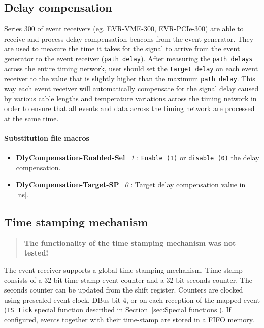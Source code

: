 \documentclass[12pt,a4paper]{article}
\begin{document}
\subsection{Delay compensation}\label{sec:Delay compensation}
Series 300 of event receivers (eg. EVR-VME-300, EVR-PCIe-300) are able to receive and process delay compensation beacons from the event generator. They are used to measure the time it takes for the signal to arrive from the event generator to the event receiver (\texttt{path delay}). After measuring the \texttt{path delays} across the entire timing network, user should set the \texttt{target delay} on each event receiver to the value that is slightly higher than the maximum \texttt{path delay}. This way each event receiver will automatically compensate for the signal delay caused by various cable lengths and temperature variations across the timing network in order to ensure that all events and data across the timing network are processed at the same time.

\paragraph{Substitution file macros}
\begin{itemize}
\item
  \textbf{DlyCompensation-Enabled-Sel}=\emph{1} : \texttt{Enable (1)} or \texttt{disable (0)} the delay compensation.
\item 
  \textbf{DlyCompensation-Target-SP}=\emph{0} : Target delay compensation value in [ns].
\end{itemize}


\subsection{Time stamping mechanism}\label{sec:Time stamping mechanism}
\begin{quote}
\textbf{The functionality of the time stamping mechanism was not tested!}
\end{quote}
The event receiver supports a global time stamping mechanism. Time-stamp consists of a 32-bit time-stamp event counter and a 32-bit seconds counter. The seconds counter can be updated from the
shift register. Counters are clocked using prescaled event clock, DBus bit 4, or on each reception of the mapped event (\texttt{TS Tick} special function described in Section~\ref{sec:Special functions}). If configured, events together with their time-stamp are stored in a FIFO memory.
\end{document}

